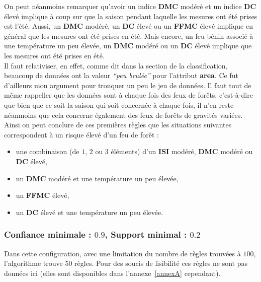 \documentclass{article}
\begin{document}
\begin{sffamily}
On peut néanmoins remarquer qu'avoir un indice \textbf{DMC} modéré et un indice \textbf{DC} élevé implique à coup sur que la saison pendant
laquelle les mesures ont été prises est l'été. Aussi, un \textbf{DMC} modéré, un \textbf{DC} élevé ou un \textbf{FFMC} élevé implique en général que 
les mesures ont été prises en été. Mais encore, un feu bénin associé à une température un peu élevée, un \textbf{DMC} modéré ou un 
\textbf{DC} élevé implique que les mesures ont été prises en été.\\
Il faut relativiser, en effet, comme dit dans la section de la classification, 
beaucoup de données ont la valeur \textit{``peu brulée''} pour l'attribut \textbf{area}. Ce fut d'ailleurs mon argument pour tronquer un peu le jeu 
de données. Il faut tout de même rappeller que les données sont à chaque fois des feux de forêts, c'est-à-dire que bien que ce soit la saison qui 
soit concernée à chaque fois, il n'en reste néanmoins que cela concerne également des feux de forêts de gravités variées. Ainsi on peut conclure de 
ces premières règles que les situations suivantes correspondent à un risque élevé d'un feu de forêt : 
\begin{itemize}
\item une combinaison (de $1$, $2$ ou $3$ éléments) d'un \textbf{ISI} modéré, \textbf{DMC} modéré ou \textbf{DC} élevé,
\item un \textbf{DMC} modéré et une température un peu élevée,
\item un \textbf{FFMC} élevé,
\item un \textbf{DC} élevé et une température un peu élevée.
\end{itemize}

\subsubsection*{Confiance minimale : $0.9$, Support minimal : $0.2$}

Dans cette configuration, avec une limitation du nombre de règles trouvées à $100$, l'algorithme trouve $50$ règles. Pour des soucis de lisibilité 
ces règles ne sont pas données ici (elles sont disponibles dans l'annexe~\ref{annexA} cependant). \\


\end{sffamily}
\end{document}
